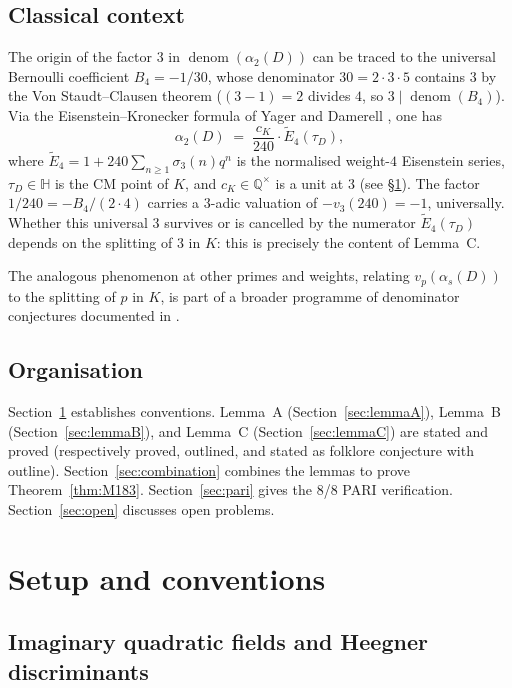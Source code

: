 \documentclass[12pt]{amsart}
\theoremstyle{definition}
\DeclareMathOperator{\denom}{denom}
\newcommand{\Q}{\mathbb{Q}}
\newcommand{\Hbb}{\mathbb{H}}
\begin{document}
\subsection{Classical context}

The origin of the factor $3$ in $\denom(\alpha_2(D))$ can be traced to
the universal Bernoulli coefficient $B_4 = -1/30$, whose denominator
$30 = 2 \cdot 3 \cdot 5$ contains $3$ by the Von Staudt--Clausen theorem
($(3-1) = 2$ divides $4$, so $3 \mid \denom(B_4)$).
Via the Eisenstein--Kronecker formula of Yager \cite{Yager1982} and
Damerell \cite{Damerell1971}, one has
\[
  \alpha_2(D) \;=\; \frac{c_K}{240} \cdot \widetilde{E}_4(\tau_D),
\]
where $\widetilde{E}_4 = 1 + 240\sum_{n \geq 1}\sigma_3(n)q^n$ is the
normalised weight-$4$ Eisenstein series, $\tau_D \in \Hbb$ is the CM point
of $K$, and $c_K \in \Q^\times$ is a unit at $3$ (see \S\ref{sec:setup}).
The factor $1/240 = -B_4/(2 \cdot 4)$ carries a $3$-adic valuation of
$-v_3(240) = -1$, universally.
Whether this universal $3$ survives or is cancelled by the numerator
$\widetilde{E}_4(\tau_D)$ depends on the splitting of $3$ in $K$:
this is precisely the content of Lemma~C.

The analogous phenomenon at other primes and weights, relating
$v_p(\alpha_s(D))$ to the splitting of $p$ in $K$, is part of a broader
programme of denominator conjectures documented in \cite{Remondiere2026M142}.

\subsection{Organisation}

Section~\ref{sec:setup} establishes conventions.
Lemma~A (Section~\ref{sec:lemmaA}), Lemma~B (Section~\ref{sec:lemmaB}),
and Lemma~C (Section~\ref{sec:lemmaC}) are stated and proved (respectively
proved, outlined, and stated as folklore conjecture with outline).
Section~\ref{sec:combination} combines the lemmas to prove Theorem~\ref{thm:M183}.
Section~\ref{sec:pari} gives the 8/8 PARI verification.
Section~\ref{sec:open} discusses open problems.

\section{Setup and conventions}
\label{sec:setup}

\subsection{Imaginary quadratic fields and Heegner discriminants}
\end{document}
